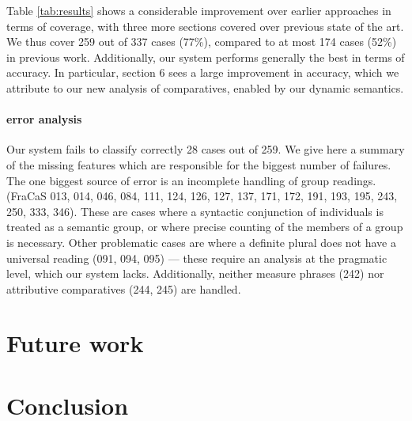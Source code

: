 \documentclass[11pt]{article}
\begin{document}
Table \ref{tab:results} shows a considerable improvement over earlier
approaches in terms of coverage, with three more sections covered over
previous state of the art. We thus cover 259 out of 337 cases (77\%),
compared to at most 174 cases (52\%) in previous work. Additionally,
our system performs generally the best in terms of accuracy. In
particular, section 6 sees a large improvement in accuracy, which we
attribute to our new analysis of comparatives, enabled by our dynamic
semantics.

\paragraph{error analysis}
Our system fails to classify correctly 28 cases out of 259.  We give
here a summary of the missing features which are responsible for the
biggest number of failures. The one biggest source of error is an
incomplete handling of group readings. (FraCaS
013, 014, 046, 084, 111, 124, 126, 127, 137, 171, 172, 191, 193, 195, 243, 250, 333, 346). These
are cases where a syntactic conjunction of individuals is treated as a
semantic group, or where precise counting of the members of a group is
necessary.  Other problematic cases are where a definite plural does
not have a universal reading (091, 094, 095) --- these require an
analysis at the pragmatic level, which our system lacks. Additionally,
neither measure phrases (242) nor attributive comparatives (244, 245)
are handled.


\section{Future work}
\section{Conclusion}




\end{document}
